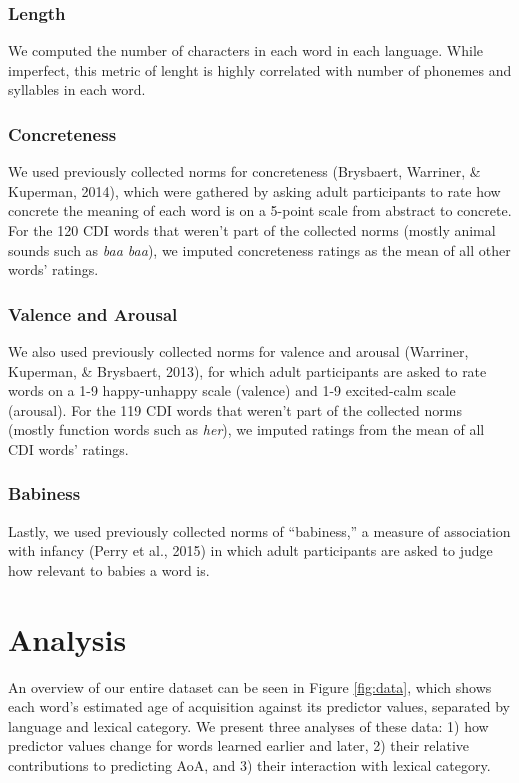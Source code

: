 \documentclass[10pt, letterpaper]{article}
\begin{document}
\subsubsection{Length}\label{length}

We computed the number of characters in each word in each language.
While imperfect, this metric of lenght is highly correlated with number
of phonemes and syllables in each word.

\subsubsection{Concreteness}\label{concreteness}

We used previously collected norms for concreteness (Brysbaert,
Warriner, \& Kuperman, 2014), which were gathered by asking adult
participants to rate how concrete the meaning of each word is on a
5-point scale from abstract to concrete. For the 120 CDI words that
weren't part of the collected norms (mostly animal sounds such as
\emph{baa baa}), we imputed concreteness ratings as the mean of all
other words' ratings.

\subsubsection{Valence and Arousal}\label{valence-and-arousal}

We also used previously collected norms for valence and arousal
(Warriner, Kuperman, \& Brysbaert, 2013), for which adult participants
are asked to rate words on a 1-9 happy-unhappy scale (valence) and 1-9
excited-calm scale (arousal). For the 119 CDI words that weren't part of
the collected norms (mostly function words such as \emph{her}), we
imputed ratings from the mean of all CDI words' ratings.

\subsubsection{Babiness}\label{babiness}

Lastly, we used previously collected norms of ``babiness,'' a measure of
association with infancy (Perry et al., 2015) in which adult
participants are asked to judge how relevant to babies a word is.

\section{Analysis}\label{analysis}

An overview of our entire dataset can be seen in Figure \ref{fig:data},
which shows each word's estimated age of acquisition against its
predictor values, separated by language and lexical category. We present
three analyses of these data: 1) how predictor values change for words
learned earlier and later, 2) their relative contributions to predicting
AoA, and 3) their interaction with lexical category.
\end{document}
